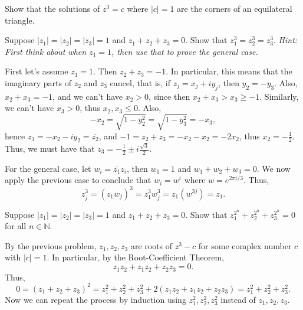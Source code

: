 \documentclass[11pt,dvipsnames]{book}
\numberwithin{equation}{section} %
\numberwithin{figure}{section} %
\numberwithin{table}{section} %
\begin{document}
\begin{exercise} Show that the solutions of $z^3=c$ where $|c|=1$ are the corners of an equilateral triangle.

\end{exercise}



\begin{exercise} Suppose $|z_{1}|=|z_{2}|=|z_{3}|=1$ and $z_{1}+z_{2}+z_{3}=0$. Show that $z_{1}^3=z_{2}^3=z_{3}^3$. {\it Hint: First think about when $z_{1}=1$, then use that to prove the general case.}

\begin{solution}
First let's assume $z_{1}=1$. Then $z_{2}+z_{3}=-1$. In particular, this means that the imaginary parts of $z_{2}$ and $z_{3}$ cancel, that is, if $z_{j}=x_{j}+iy_{j}$, then $y_{2}=-y_{3}$. Also, $x_{2}+x_{3}=-1$, and we can't have $x_{2}>0$, since then $x_{2}+x_{3}>x_{3}\geq -1$. Similarly, we can't have $x_{3}>0$, thus $x_{2},x_{3}\leq 0$. Also, 
\[
-x_{2} = \sqrt{1-y_{2}^2} = \sqrt{1-y_{3}^2}= -x_{3},\]
hence $z_{3} = -x_{2} -iy_{2} = \overline{z_{2}}$, and $-1=z_{2}+z_{3}=-x_{2}-x_{2}=-2x_{2}$, thus $x_{2}=-\frac{1}{2}$. Thus, we must have that $z_{3} = -\frac{1}{2}\pm i\frac{\sqrt{3}}{2}$. 

For the general case, let $w_{i}=\overline{z_{1}}z_{i}$, then $w_{1}=1$ and $w_{1}+w_{2}+w_{3}=0$. We now apply the previous case to conclude that $w_{i} = w^{i}$ where $w=e^{2\pi i/3}$. Thus,
\[
z_{j}^3 = (z_{1} w_{j})^3 = z_{1}^3 w_{j}^3 = z_{1} (w^{3j})=z_{1}.
\]


\end{solution}

\end{exercise}




\begin{exercise} Suppose $|z_{1}|=|z_{2}|=|z_{3}|=1$ and $z_{1}+z_{2}+z_{3}=0$. Show that $z_{1}^{2^{n}}+z_{2}^{2^{n}}+z_{3}^{2^{n}}=0$ for all $n\in \mathbb{N}$. 

\begin{solution}
By the previous problem, $z_1,z_2,z_3$ are roots of $z^3-c$ for some complex number $c$ with $|c|=1$. In particular, by the Root-Coefficient Theorem,
\[
z_{1}z_{2}+z_{1}z_{2}+z_{2}z_{3}=0.
\]
Thus, 
\[
0=(z_{1}+z_{2}+z_{3})^2 = z_{1}^2+z_{2}^2+z_{3}^2 + 2(z_{1}z_{2}+z_{1}z_{2}+z_{2}z_{3})=z_{1}^2+z_{2}^2+z_{3}^2 .
\]
Now we can repeat the process by induction using $z_{1}^2,z_{2}^2,z_{3}^2$ instead of $z_1,z_2,z_3$.
\end{solution} 


\end{exercise}
\end{document}
